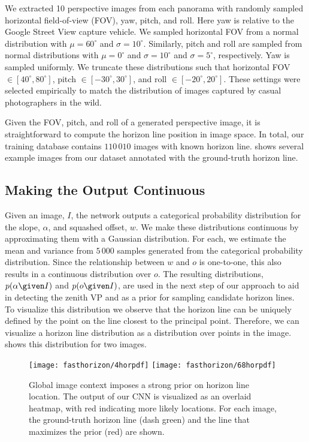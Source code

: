 We extracted 10 perspective images from each panorama with randomly
sampled horizontal field-of-view (FOV), yaw, pitch, and roll. Here yaw
is relative to the Google Street View capture vehicle. We sampled
horizontal FOV from a normal distribution with $\mu=60^\circ$ and
$\sigma=10^\circ$. Similarly, pitch and roll are sampled from normal
distributions with $\mu=0^\circ$ and $\sigma=10^\circ$ and
$\sigma=5^\circ$, respectively. Yaw is sampled uniformly.  We truncate
these distributions such that horizontal FOV $\in [40^\circ,
80^\circ]$, pitch $\in [-30^\circ, 30^\circ]$, and roll $\in
[-20^\circ, 20^\circ]$. These settings were selected empirically to
match the distribution of images captured by casual photographers in
the wild.

Given the FOV, pitch, and roll of a generated perspective image, it is
straightforward to compute the horizon line position in image space.
In total, our training database contains $110\,010$ images with known
horizon line.   shows several example images from
our dataset annotated with the ground-truth horizon line.

\subsection{Making the Output Continuous}

Given an image, $I$, the network outputs a categorical probability
distribution for the slope, $\alpha$, and squashed offset, $w$. We
make these distributions continuous by approximating them with a
Gaussian distribution. For each, we estimate the mean and variance
from $5\,000$ samples generated from the categorical probability
distribution. Since the relationship between $w$ and $o$ is
one-to-one, this also results in a continuous distribution over
$o$. The resulting distributions, $p(\alpha \given I)$ and $p(o \given
I)$, are used in the next step of our approach to aid in detecting the
zenith VP and as a prior for sampling candidate horizon
lines. To visualize this distribution we observe that the horizon line
can be uniquely defined by the point on the line closest to the
principal point. Therefore, we can visualize a horizon line
distribution as a distribution over points in the image.
 shows this distribution for two images.

\begin{figure}
 \centering
 \texttt{[image: fasthorizon/4horpdf]}
 \texttt{[image: fasthorizon/68horpdf]}

 \caption{Global image context imposes a strong prior on horizon line
   location. The output of our CNN is visualized as an overlaid
   heatmap, with red indicating more likely locations. For each image,
   the ground-truth horizon line (dash green) and the line that
   maximizes the prior (red) are shown.}

 \label{fig:horpdf}
\end{figure}

